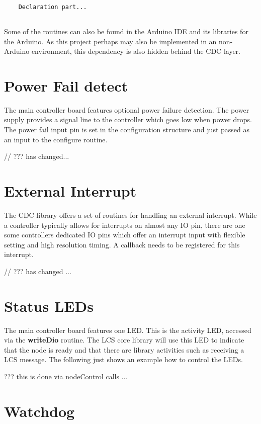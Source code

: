 \lstset{language=c++, style=codesnippetstyle}
\begin{lstlisting}
   
    Declaration part...
    
\end{lstlisting}
\FloatBarrier

Some of the routines can also be found in the Arduino IDE and its libraries for the Arduino. As this project perhaps may also be implemented in an non-Arduino environment, this dependency is also hidden behind the CDC layer.

\section{Power Fail detect}

The main controller board features optional power failure detection. The power supply provides a signal line to the controller which goes low when power drops. The power fail input pin is set in the configuration structure and just passed as an input to the configure routine. 


// ??? has changed...


\section{External Interrupt}

The CDC library offers a set of routines for handling an external interrupt. While a controller typically allows for interrupts on almost any IO pin, there are one some controllers dedicated IO pins which offer an interrupt input with flexible setting and high resolution timing. A callback needs to be registered for this interrupt.

// ??? has changed ...


\section{Status LEDs}

The main controller board features one LED. This is the activity LED, accessed via the \textbf{writeDio} routine. The LCS core library will use this LED to indicate that the node is ready and that there are library activities such as receiving a LCS message. The following just shows an example how to control the LEDs.

??? this is done via nodeControl calls ...

\section{Watchdog}

